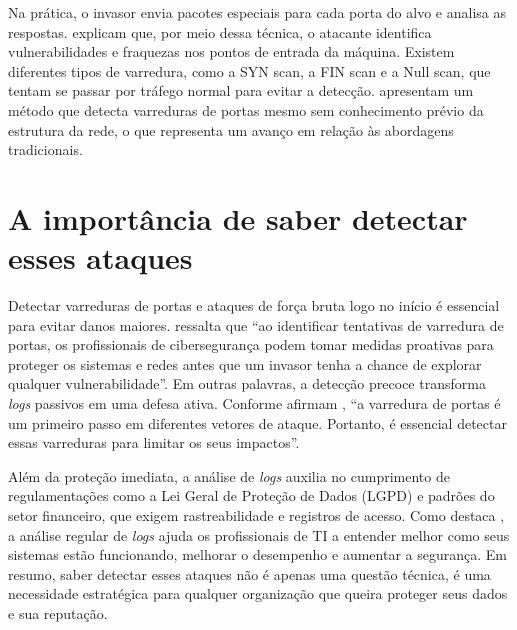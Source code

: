 \documentclass[
    12pt
    ,oneside
    ,a4paper
    ,chapter=TITLE
    ,section=TITLE
    ,sumario=abnt-6027-2012]{abntex2}
\begin{document}
Na prática, o invasor envia pacotes especiais para cada porta do alvo e analisa as respostas.  explicam que, por meio dessa técnica, o atacante identifica vulnerabilidades e fraquezas nos pontos de entrada da máquina. Existem diferentes tipos de varredura, como a SYN scan, a FIN scan e a Null scan, que tentam se passar por tráfego normal para evitar a detecção.  apresentam um método que detecta varreduras de portas mesmo sem conhecimento prévio da estrutura da rede, o que representa um avanço em relação às abordagens tradicionais.

\section{A importância de saber detectar esses ataques}

Detectar varreduras de portas e ataques de força bruta logo no início é essencial para evitar danos maiores.  ressalta que “ao identificar tentativas de varredura de portas, os profissionais de cibersegurança podem tomar medidas proativas para proteger os sistemas e redes antes que um invasor tenha a chance de explorar qualquer vulnerabilidade”. Em outras palavras, a detecção precoce transforma \textit{logs} passivos em uma defesa ativa. Conforme afirmam , “a varredura de portas é um primeiro passo em diferentes vetores de ataque. Portanto, é essencial detectar essas varreduras para limitar os seus impactos”.

Além da proteção imediata, a análise de \textit{logs} auxilia no cumprimento de regulamentações como a Lei Geral de Proteção de Dados (LGPD) e padrões do setor financeiro, que exigem rastreabilidade e registros de acesso. Como destaca , a análise regular de \textit{logs} ajuda os profissionais de TI a entender melhor como seus sistemas estão funcionando, melhorar o desempenho e aumentar a segurança. Em resumo, saber detectar esses ataques não é apenas uma questão técnica, é uma necessidade estratégica para qualquer organização que queira proteger seus dados e sua reputação.


\end{document}
